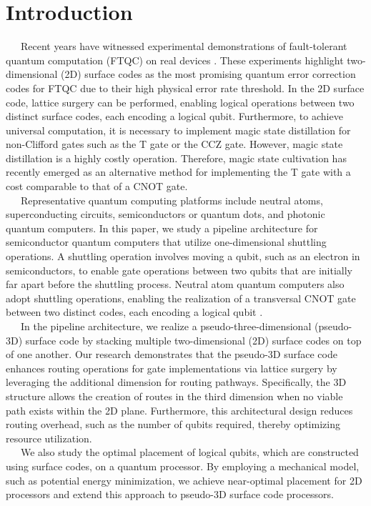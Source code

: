 \documentclass[a4paper,11pt]{ltjsarticle}
\begin{document}
\section{Introduction}{
    \ \ \ Recent years have witnessed experimental demonstrations of fault-tolerant quantum computation (FTQC) on real devices \cite{bluvstein2024, google2024}. These experiments highlight two-dimensional (2D) surface codes as the most promising quantum error correction codes for FTQC due to their high physical error rate threshold. In the 2D surface code, lattice surgery \cite{horsman2012} can be performed, enabling logical operations between two distinct surface codes, each encoding a logical qubit. Furthermore, to achieve universal computation, it is necessary to implement magic state distillation \cite{litinski2019-2} for non-Clifford gates such as the T gate or the CCZ gate. However, magic state distillation is a highly costly operation. Therefore, magic state cultivation \cite{gidney2024} has recently emerged as an alternative method for implementing the T gate with a cost comparable to that of a CNOT gate.\\
    \ \ \ Representative quantum computing platforms include neutral atoms, superconducting circuits, semiconductors or quantum dots, and photonic quantum computers. In this paper, we study a pipeline architecture \cite{cai2023} for semiconductor quantum computers that utilize one-dimensional shuttling operations. A shuttling operation involves moving a qubit, such as an electron in semiconductors, to enable gate operations between two qubits that are initially far apart before the shuttling process. Neutral atom quantum computers also adopt shuttling operations, enabling the realization of a transversal CNOT gate between two distinct codes, each encoding a logical qubit \cite{reichardt2024}.\\
    \ \ \ In the pipeline architecture, we realize a pseudo-three-dimensional (pseudo-3D) surface code by stacking multiple two-dimensional (2D) surface codes on top of one another. Our research demonstrates that the pseudo-3D surface code enhances routing operations for gate implementations via lattice surgery by leveraging the additional dimension for routing pathways. Specifically, the 3D structure allows the creation of routes in the third dimension when no viable path exists within the 2D plane. Furthermore, this architectural design reduces routing overhead, such as the number of qubits required, thereby optimizing resource utilization.\\
    \ \ \ We also study the optimal placement of logical qubits, which are constructed using surface codes, on a quantum processor. By employing a mechanical model, such as potential energy minimization, we achieve near-optimal placement for 2D processors and extend this approach to pseudo-3D surface code processors.\\
}
\end{document}
